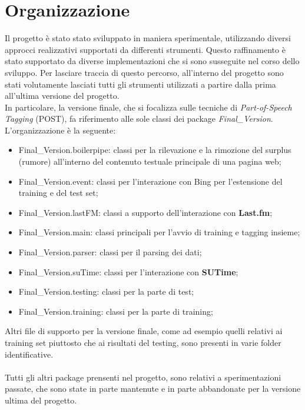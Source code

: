 \documentclass[a4paper]{report}
\begin{document}
\section{Organizzazione}
Il progetto è stato stato sviluppato in maniera sperimentale, utilizzando diversi approcci realizzativi supportati da differenti strumenti. Questo raffinamento è stato supportato da diverse implementazioni che si sono susseguite nel corso dello sviluppo. Per lasciare traccia di questo percorso, all'interno del progetto sono stati volutamente lasciati tutti gli strumenti utilizzati a partire dalla prima all'ultima versione del progetto. \\
In particolare, la versione finale, che si focalizza sulle tecniche di \textit{Part-of-Speech Tagging} (POST), fa riferimento alle sole classi dei package \textit{Final\_Version}. \\L'organizzazione è la seguente:
\begin{itemize}
\item Final\_Version.boilerpipe: classi per la rilevazione e la rimozione del surplus (rumore) all'interno del contenuto testuale principale di una pagina web;
\item Final\_Version.event: classi per l'interazione con Bing per l'estensione del training e del test set;
\item Final\_Version.lastFM: classi a supporto dell'interazione con \textbf{Last.fm};
\item Final\_Version.main: classi principali per l'avvio di training e tagging insieme; 
\item Final\_Version.parser: classi per il parsing  dei dati;
\item Final\_Version.suTime: classi per l'interazione con \textbf{SUTime};
\item Final\_Version.testing: classi per la parte di test;
\item Final\_Version.training: classi per la parte di training;
\end{itemize}
Altri file di supporto per la versione finale, come ad esempio quelli relativi ai training set piuttosto che ai risultati del testing, sono presenti in varie folder identificative. \\ \\
Tutti gli altri package prensenti nel progetto, sono relativi a sperimentazioni passate, che sono state in parte mantenute e in parte abbandonate per la versione ultima del progetto. 
\end{document}
